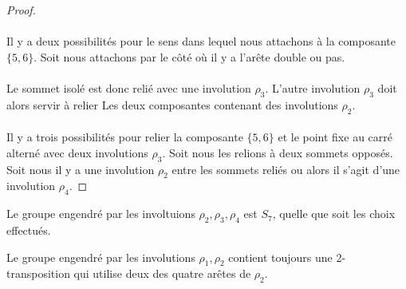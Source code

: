 \begin{proof}
\paragraph{}
Il y a deux possibilités pour le sens dans lequel nous attachons à la composante $\{5,6\}$. Soit nous attachons par le côté où il y a l'arête double ou pas.

\paragraph{}
Le sommet isolé est donc relié avec une involution $\rho_3$. L'autre involution $\rho_3$ doit alors servir à relier Les deux composantes contenant des involutions $\rho_2$.

\paragraph{}
Il y a trois possibilités pour relier la composante $\{5,6\}$ et le point fixe au carré alterné avec deux involutions $\rho_3$. Soit nous les relions à deux sommets opposés. Soit nous il y a une involution $\rho_2$ entre les sommets reliés ou alors il s'agit d'une involution $\rho_4$.

\end{proof}

\begin{theorem}
  Le groupe engendré par les involtuions $\rho_2, \rho_3, \rho_4$ est $S_7$, quelle que soit les choix effectués.
\end{theorem}

\begin{theorem}
  Le groupe engendré par les involutions $\rho_1, \rho_2$ contient toujours une 2-transposition qui utilise deux des quatre arêtes de $\rho_2$.
\end{theorem}

